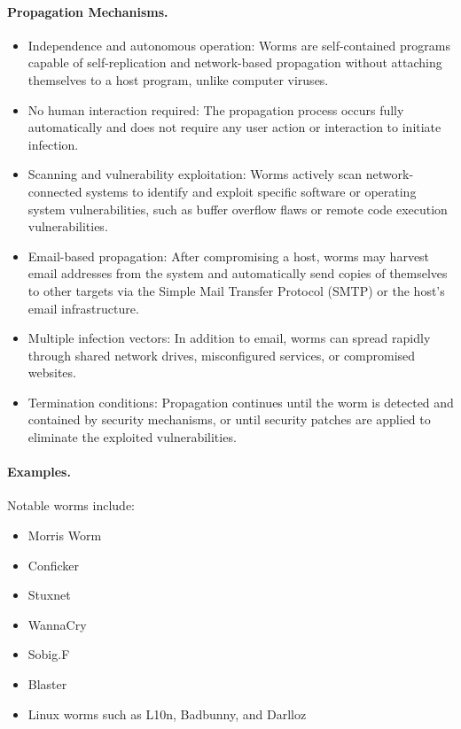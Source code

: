 \paragraph{Propagation Mechanisms.}
\begin{itemize}
  \item Independence and autonomous operation: Worms are self-contained programs capable of self-replication and network-based propagation without attaching themselves to a host program, unlike computer viruses.
  \item No human interaction required: The propagation process occurs fully automatically and does not require any user action or interaction to initiate infection.
  \item Scanning and vulnerability exploitation: Worms actively scan network-connected systems to identify and exploit specific software or operating system vulnerabilities, such as buffer overflow flaws or remote code execution vulnerabilities.
  \item Email-based propagation: After compromising a host, worms may harvest email addresses from the system and automatically send copies of themselves to other targets via the Simple Mail Transfer Protocol (SMTP) or the host's email infrastructure.
  \item Multiple infection vectors: In addition to email, worms can spread rapidly through shared network drives, misconfigured services, or compromised websites.
  \item Termination conditions: Propagation continues until the worm is detected and contained by security mechanisms, or until security patches are applied to eliminate the exploited vulnerabilities.
\end{itemize}

\paragraph{Examples.}
Notable worms include:

\begin{itemize}
  \item Morris Worm
  \item Conficker
  \item Stuxnet
  \item WannaCry
  \item Sobig.F
  \item Blaster
  \item Linux worms such as L10n, Badbunny, and Darlloz
\end{itemize}

